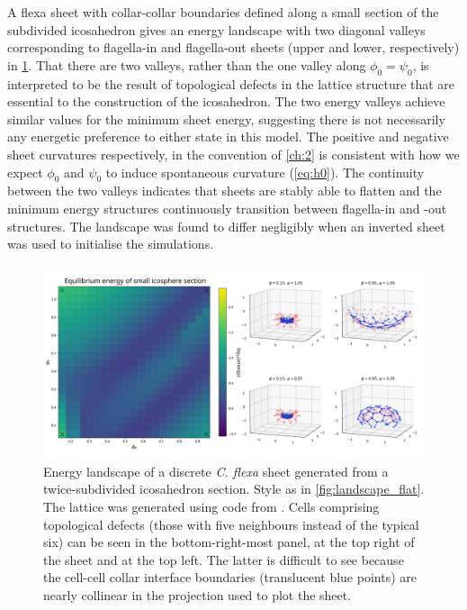 A flexa sheet with collar-collar boundaries defined along a small section of the subdivided icosahedron gives an energy landscape with two diagonal valleys corresponding to flagella-in and flagella-out sheets (upper and lower, respectively) in \cref{fig:landscape_ico}.
That there are two valleys, rather than the one valley along $\phi_0 = \psi_0$, is interpreted to be the result of topological defects in the lattice structure that are essential to the construction of the icosahedron. 
The two energy valleys achieve similar values for the minimum sheet energy, suggesting there is not necessarily any energetic preference to either state in this model.
The positive and negative sheet curvatures respectively, in the convention of \cref{ch:2} is consistent with how we expect $\phi_0$ and $\psi_0$ to induce spontaneous curvature (\cref{eq:h0}).
The continuity between the two valleys indicates that sheets are stably able to flatten and the minimum energy structures continuously transition between flagella-in and -out structures. 
The landscape was found to differ negligibly when an inverted sheet was used to initialise the simulations.

\begin{figure}[hbtp]
	\centering
	\includegraphics[width=\textwidth]{landscape_ico.png}
	\caption[Energy landscape of a discrete \textit{C. flexa} sheet generated from a small subdivided icosahedron section]{Energy landscape of a discrete \textit{C. flexa} sheet generated from a twice-subdivided icosahedron section. Style as in \cref{fig:landscape_flat}. The lattice was generated using code from \citep{dahl2014}. Cells comprising topological defects (those with five neighbours instead of the typical six) can be seen in the bottom-right-most panel, at the top right of the sheet and at the top left. The latter is difficult to see because the cell-cell collar interface boundaries (translucent blue points) are nearly collinear in the projection used to plot the sheet.}
	\label{fig:landscape_ico}
\end{figure}


